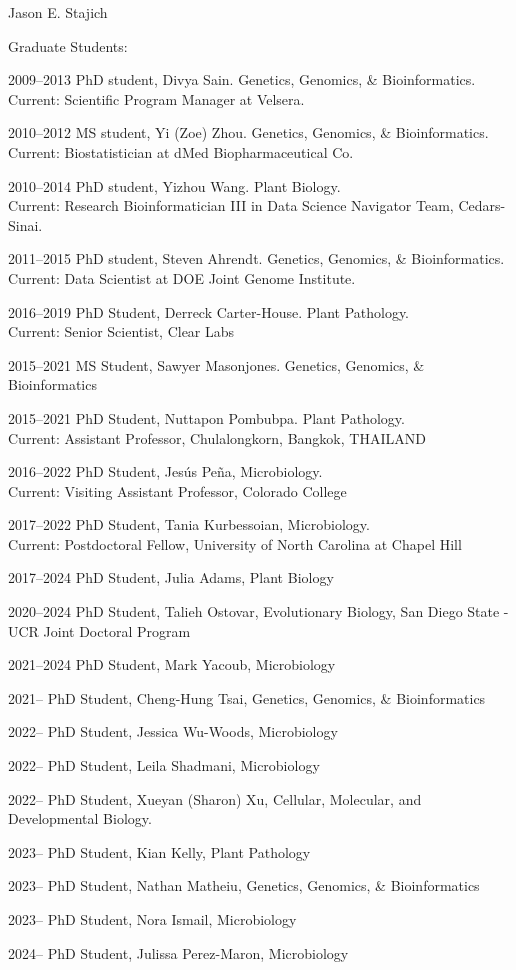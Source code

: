 \documentclass[10pt]{article}
\begin{document}
\begin{cv}{\centerline{Jason E. Stajich}}
\begin{cvlistcompact}{Graduate Students:}
\item [2009--2013] PhD student, Divya Sain. Genetics, Genomics, \&
  Bioinformatics. \\ Current: Scientific Program Manager at Velsera.
\item [2010--2012] MS student, Yi (Zoe) Zhou. Genetics, Genomics, \&
  Bioinformatics. \\ Current: Biostatistician at dMed Biopharmaceutical Co.
\item [2010--2014] PhD student, Yizhou Wang. Plant Biology. \\ Current:
  Research Bioinformatician III in Data Science Navigator Team, Cedars-Sinai.
\item [2011--2015] PhD student, Steven Ahrendt. Genetics, Genomics, \&
  Bioinformatics. \\ Current: Data Scientist at DOE Joint Genome Institute.
\item [2016--2019] PhD Student, Derreck Carter-House. Plant Pathology. \\ Current: Senior Scientist, Clear Labs
\item [2015--2021] MS Student, Sawyer Masonjones. Genetics, Genomics, \&
  Bioinformatics
\item [2015--2021] PhD Student, Nuttapon Pombubpa. Plant Pathology. \\ Current: Assistant Professor, Chulalongkorn, Bangkok, THAILAND
\item [2016--2022] PhD Student, Jes\'{u}s Pe\~{n}a, Microbiology. \\ Current: Visiting Assistant Professor, Colorado College
\item [2017--2022] PhD Student, Tania Kurbessoian, Microbiology. \\ Current: Postdoctoral Fellow, University of North Carolina at Chapel Hill
\item [2017--2024] PhD Student, Julia Adams, Plant Biology
\item [2020--2024] PhD Student, Talieh Ostovar, Evolutionary Biology, San Diego State - UCR Joint Doctoral Program
\item [2021--2024] PhD Student, Mark Yacoub, Microbiology
\item [2021--] PhD Student, Cheng-Hung Tsai, Genetics, Genomics, \& Bioinformatics
\item [2022--] PhD Student, Jessica Wu-Woods, Microbiology
\item [2022--] PhD Student, Leila Shadmani, Microbiology
\item [2022--] PhD Student, Xueyan (Sharon) Xu, Cellular, Molecular, and Developmental Biology.
\item [2023--] PhD Student, Kian Kelly, Plant Pathology
\item [2023--] PhD Student, Nathan Matheiu, Genetics, Genomics, \& Bioinformatics
\item [2023--] PhD Student, Nora Ismail, Microbiology
\item [2024--] PhD Student, Julissa Perez-Maron, Microbiology


\end{cvlistcompact}
\end{cv}
\end{document}
